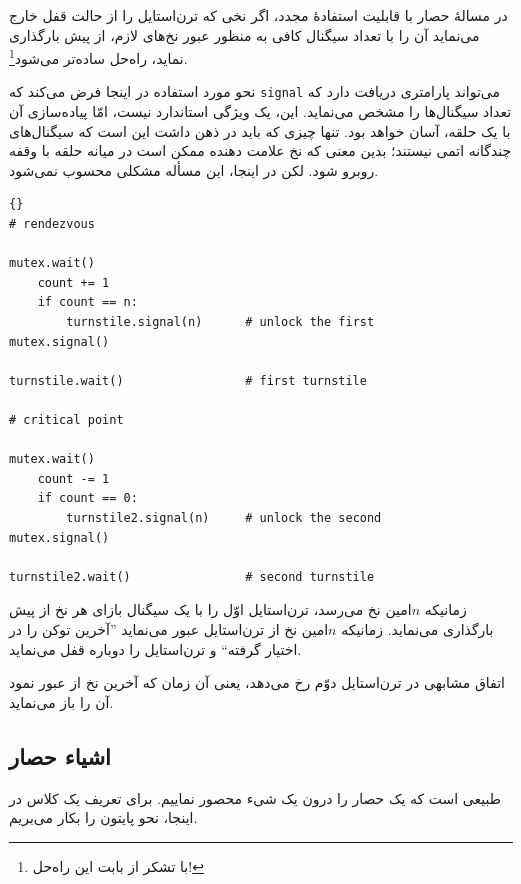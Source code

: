 \documentclass{book}
\begin{document}
    در مسالهٔ حصار با قابلیت استفادهٔ مجدد، اگر نخی که ترن‌استایل را از حالت قفل خارج می‌نماید 
    آن را با تعداد سیگنال کافی به منظور عبور نخ‌های لازم، از پیش بارگذاری نماید، راه‌حل ساده‌تر می‌شود\footnote{با تشکر از  بابت این راه‌حل!}. 

    نحو مورد استفاده در اینجا فرض می‌کند که \texttt{signal} می‌تواند پارامتری دریافت دارد که تعداد سیگنال‌ها را مشخص می‌نماید. 
    این، یک ویژگی استاندارد نیست، امّا پیاده‌سازی آن با یک حلقه، آسان خواهد بود. تنها چیزی که باید در ذهن داشت این است که سیگنال‌های چندگانه 
    اتمی نیستند؛ بدین معنی که نخ علامت دهنده ممکن است در میانه حلقه با وقفه روبرو شود. لکن در اینجا، این مسأله مشکلی محسوب نمی‌شود.

\begin{latin}
\begin{lstlisting}[title=\rl{راه‌حل حصار با قابلیت استفادهٔ مجدد}]{}
# rendezvous

mutex.wait()
    count += 1
    if count == n:
        turnstile.signal(n)      # unlock the first
mutex.signal()

turnstile.wait()                 # first turnstile

# critical point

mutex.wait()
    count -= 1
    if count == 0:
        turnstile2.signal(n)     # unlock the second
mutex.signal()

turnstile2.wait()                # second turnstile
\end{lstlisting}
\end{latin}

    زمانیکه $n$امین نخ می‌رسد، ترن‌استایل اوّل را با یک سیگنال بازای هر نخ از پیش بارگذاری می‌نماید.
    زمانیکه $n$امین نخ از ترن‌استایل عبور می‌نماید ''آخرین توکن را در اختیار گرفته`` و ترن‌استایل را دوباره قفل می‌نماید. 
    

    اتفاق مشابهی در ترن‌استایل دوّم  رخ می‌دهد،  یعنی آن زمان که آخرین نخ از  عبور نمود آن را باز می‌نماید. 

\newpage
\subsection {اشیاء حصار}

    طبیعی است که یک حصار را درون یک شیء محصور نماییم. 
    برای تعریف یک کلاس در اینجا، نحو پایتون را بکار می‌بریم. 
\end{document}
